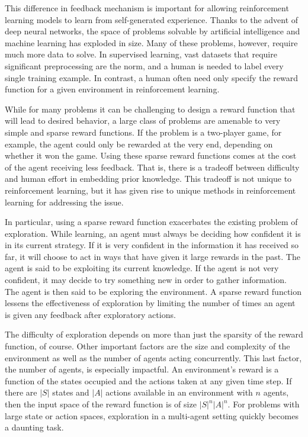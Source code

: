 \documentclass[11pt,journal,compsoc]{IEEEtran}
\begin{document}
	This difference in feedback mechanism is important for allowing reinforcement learning models to learn from self-generated experience. Thanks to the advent of deep neural networks, the space of problems solvable by artificial intelligence and machine learning has exploded in size. Many of these problems, however, require much more data to solve. In supervised learning, vast datasets that require significant preprocessing are the norm, and a human is needed to label every single training example. In contrast, a human often need only specify the reward function for a given environment in reinforcement learning. 
	
	While for many problems it can be challenging to design a reward function that will lead to desired behavior, a large class of problems are amenable to very simple and sparse reward functions. If the problem is a two-player game, for example, the agent could only be rewarded at the very end, depending on whether it won the game. Using these sparse reward functions comes at the cost of the agent receiving less feedback. That is, there is a tradeoff between difficulty and human effort in embedding prior knowledge. This tradeoff is not unique to reinforcement learning, but it has given rise to unique methods in reinforcement learning for addressing the issue.
	
	In particular, using a sparse reward function exacerbates the existing problem of exploration. While learning, an agent must always be deciding how confident it is in its current strategy. If it is very confident in the information it has received so far, it will choose to act in ways that have given it large rewards in the past. The agent is said to be exploiting its current knowledge. If the agent is not very confident, it may decide to try something new in order to gather information. The agent is then said to be exploring the environment. A sparse reward function lessens the effectiveness of exploration by limiting the number of times an agent is given any feedback after exploratory actions.
	
	The difficulty of exploration depends on more than just the sparsity of the reward function, of course. Other important factors are the size and complexity of the environment as well as the number of agents acting concurrently. This last factor, the number of agents, is especially impactful. An environment's reward is a function of the states occupied and the actions taken at any given time step. If there are $\lvert S \rvert$ states and $\lvert A \rvert$ actions available in an environment with $n$ agents, then the input space of the reward function is of size $\lvert S \rvert^n \lvert A \rvert^n$. For problems with large state or action spaces, exploration in a multi-agent setting quickly becomes a daunting task.
	
\end{document}
